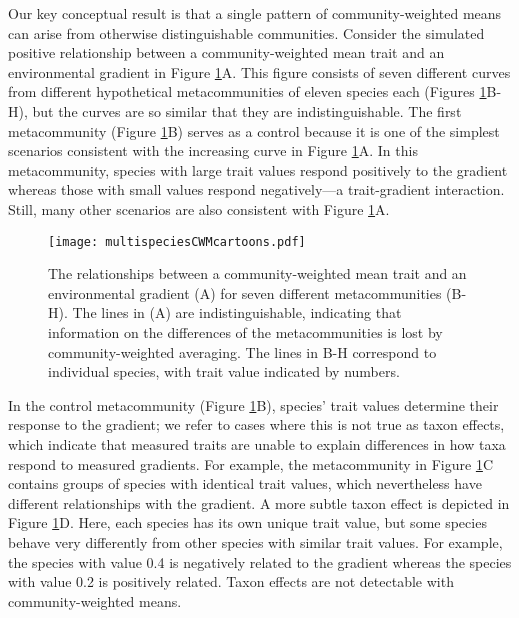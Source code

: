 \documentclass[12pt]{ecology}
\begin{document}
Our key conceptual result is that a single pattern of community-weighted means can arise from otherwise distinguishable communities.  Consider the simulated positive relationship between a community-weighted mean trait and an environmental gradient in Figure \ref{fig:graphicalmodels}A.  This figure consists of seven different curves from different hypothetical metacommunities of eleven species each (Figures \ref{fig:graphicalmodels}B-H), but the curves are so similar that they are indistinguishable.  The first metacommunity (Figure \ref{fig:graphicalmodels}B) serves as a control because it is one of the simplest scenarios consistent with the increasing curve in Figure \ref{fig:graphicalmodels}A.  In this metacommunity, species with large trait values respond positively to the gradient whereas those with small values respond negatively---a trait-gradient interaction.  Still, many other scenarios are also consistent with Figure \ref{fig:graphicalmodels}A.

\begin{figure}

\texttt{[image: multispeciesCWMcartoons.pdf]}

\caption{The relationships between a community-weighted mean trait and an environmental gradient (A) for seven different metacommunities (B-H).  The lines in (A) are indistinguishable, indicating that information on the differences of the metacommunities is lost by community-weighted averaging.  The lines in B-H correspond to individual species, with trait value indicated by numbers.}
\label{fig:graphicalmodels}

\end{figure}

In the control metacommunity (Figure \ref{fig:graphicalmodels}B), species' trait values determine their response to the gradient; we refer to cases where this is not true as taxon effects, which indicate that measured traits are unable to explain differences in how taxa respond to measured gradients.  For example, the metacommunity in Figure \ref{fig:graphicalmodels}C contains groups of species with identical trait values, which nevertheless have different relationships with the gradient.  A more subtle taxon effect is depicted in Figure \ref{fig:graphicalmodels}D.  Here, each species has its own unique trait value, but some species behave very differently from other species with similar trait values.  For example, the species with value 0.4 is negatively related to the gradient whereas the species with value 0.2 is positively related.  Taxon effects are not detectable with community-weighted means.
\end{document}

